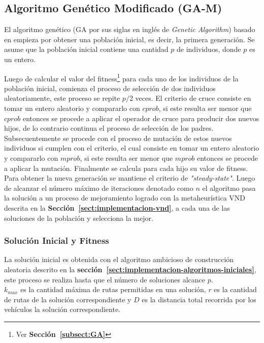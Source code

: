 \subsection{Algoritmo Genético Modificado (GA-M)} \label{implementacion-GA-M}

El algoritmo genético (GA por sus siglas en inglés de \emph{Genetic Algorithm}) basado en \cite{IGAimp} empieza por obtener una población inicial, es decir, la primera generación. Se asume que la población inicial contiene una cantidad $p$ de individuos, donde $p$ es un entero. 

Luego de calcular el valor del fitness\footnote{Ver \textbf{Sección~\ref{subsect:GA}}} para cada uno de los individuos de la población inicial, comienza el proceso de selección de dos individuos aleatoriamente, este proceso se repite $p/2$ veces. El criterio de cruce consiste en tomar un entero aleatorio y compararlo con $cprob$, si este resulta ser menor que $cprob$ entonces se procede a aplicar el operador de cruce para producir dos nuevos hijos, de lo contrario continua el proceso de selección de los padres. Subsecuentemente se procede con el proceso de mutación de estos nuevos individuos si cumplen con el criterio, el cual consiste en tomar un entero aleatorio y compararlo con $mprob$, si este resulta ser menor que $mprob$ entonces se procede a aplicar la mutación. Finalmente se calcula para cada hijo su valor de fitness. Para obtener la nueva generación se mantiene el criterio de \textit{"steady-state"}. Luego de alcanzar el número máximo de iteraciones denotado como $n$ el algoritmo pasa la solución a un proceso de mejoramiento logrado con la metaheurística VND  descrita en la \textbf{Sección~\ref{sect:implementacion-vnd}}, a cada una de las soluciones de la población y selecciona la mejor.\\ 

\subsubsection*{Solución Inicial y Fitness}

La solución inicial es obtenida con el algoritmo ambicioso de construcción aleatoria descrito en la \textbf{sección~\ref{sect:implementacion-algoritmos-iniciales}}, este proceso se realiza hasta que el número de soluciones alcance $p$.\\

$k_{max}$ es la cantidad máxima de rutas permitidas en una solución, $r$ es la cantidad de rutas de la solución co\-rres\-pon\-dien\-te y $D$ es la distancia total recorrida por los vehículos la solución correspondiente.\\ 

